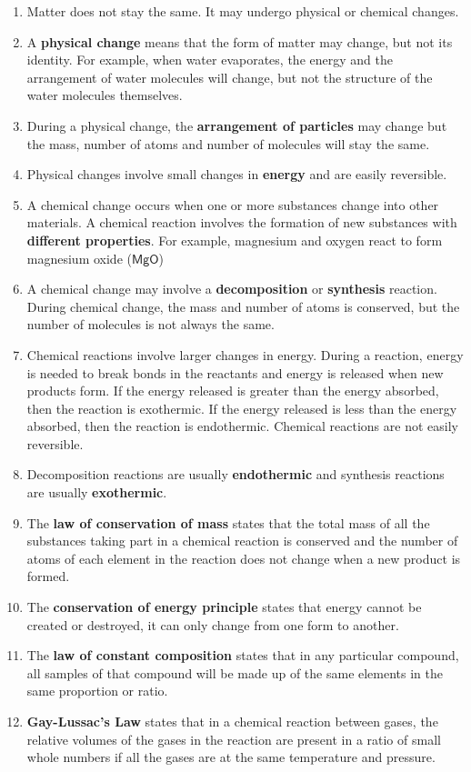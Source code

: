       \label{m38711*id65342}\begin{enumerate}[noitemsep, label=\textbf{\arabic*}. ] 
            \label{m38711*uid40}\item Matter does not stay the same. It may undergo physical or chemical changes.
\label{m38711*uid41}\item A \textbf{physical change} means that the form of matter may change, but not its identity. For example, when water evaporates, the energy and the arrangement of water molecules will change, but not the structure of the water molecules themselves.
\label{m38711*uid42}\item During a physical change, the \textbf{arrangement of particles} may change but the mass, number of atoms and number of molecules will stay the same.
\label{m38711*uid43}\item Physical changes involve small changes in \textbf{energy} and are easily reversible.
\label{m38711*uid44}\item A chemical change occurs when one or more substances change into other materials. A chemical reaction involves the formation of new substances with \textbf{different properties}. For example, magnesium and oxygen react to form magnesium oxide ($\mathsf{MgO}$) \label{m38711*uid45}\item A chemical change may involve a \textbf{decomposition} or \textbf{synthesis} reaction. During chemical change, the mass and number of atoms is conserved, but the number of molecules is not always the same.
\label{m38711*uid46}\item Chemical reactions involve larger changes in energy. During a reaction, energy is needed to break bonds in the reactants and energy is released when new products form. If the energy released is greater than the energy absorbed, then the reaction is exothermic. If the energy released is less than the energy absorbed, then the reaction is endothermic. Chemical reactions are not easily reversible.
\label{m38711*uid47}\item Decomposition reactions are usually \textbf{endothermic} and synthesis reactions are usually \textbf{exothermic}.
\label{m38711*uid48}\item The \textbf{law of conservation of mass} states that the total mass of all the substances taking part in a chemical reaction is conserved and the number of atoms of each element in the reaction does not change when a new product is formed.
\label{m38711*uid49}\item The \textbf{conservation of energy principle} states that energy cannot be created or destroyed, it can only change from one form to another.
\label{m38711*uid50}\item The \textbf{law of constant composition} states that in any particular compound, all samples of that compound will be made up of the same elements in the same proportion or ratio.
\label{m38711*uid51}\item \textbf{Gay-Lussac's Law} states that in a chemical reaction between gases, the relative volumes of the gases in the reaction are present in a ratio of small whole numbers if all the gases are at the same temperature and pressure.
\end{enumerate}
